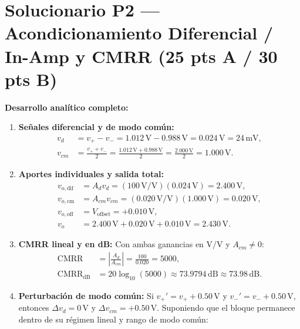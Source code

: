\documentclass[10pt, a4paper]{article}
\begin{document}
\section*{Solucionario P2 --- Acondicionamiento Diferencial / In-Amp y CMRR (25 pts A / 30 pts B)}

\textbf{Desarrollo analítico completo:}
\begin{enumerate}
    \renewcommand{\labelenumi}{(\alph{enumi})}
    \setlength{\itemsep}{3pt}
    \item \textbf{Señales diferencial y de modo común:}
    \begin{align}
        v_d &= v_+ - v_- = 1.012\,\mathrm{V} - 0.988\,\mathrm{V} = 0.024\,\mathrm{V} = 24\,\mathrm{mV}, \\
        v_{cm} &= \frac{v_+ + v_-}{2} = \frac{1.012\,\mathrm{V} + 0.988\,\mathrm{V}}{2} = \frac{2.000\,\mathrm{V}}{2} = 1.000\,\mathrm{V}.
    \end{align}
    \item \textbf{Aportes individuales y salida total:}
    \begin{align}
        v_{o,\mathrm{dif}} &= A_d v_d = (100\,\mathrm{V/V})(0.024\,\mathrm{V}) = 2.400\,\mathrm{V}, \\
        v_{o,\mathrm{cm}} &= A_{cm} v_{cm} = (0.020\,\mathrm{V/V})(1.000\,\mathrm{V}) = 0.020\,\mathrm{V}, \\
        v_{o,\mathrm{off}} &= V_{\mathrm{offset}} = +0.010\,\mathrm{V}, \\
        v_o &= 2.400\,\mathrm{V} + 0.020\,\mathrm{V} + 0.010\,\mathrm{V} = 2.430\,\mathrm{V}.
    \end{align}
    \item \textbf{CMRR lineal y en dB:} Con ambas ganancias en $\mathrm{V/V}$ y $A_{cm} \neq 0$:
    \begin{align}
        \mathrm{CMRR} &= \left|\frac{A_d}{A_{cm}}\right| = \frac{100}{0.020} = 5000, \\
        \mathrm{CMRR}_{\mathrm{dB}} &= 20\log_{10}(5000) \approx 73.9794\,\mathrm{dB} \approx 73.98\,\mathrm{dB}.
    \end{align}
    \item \textbf{Perturbación de modo común:} Si $v_+' = v_+ + 0.50\,\mathrm{V}$ y $v_-' = v_- + 0.50\,\mathrm{V}$, entonces $\Delta v_d = 0\,\mathrm{V}$ y $\Delta v_{cm} = +0.50\,\mathrm{V}$. Suponiendo que el bloque permanece dentro de su régimen lineal y rango de modo común:

\end{enumerate}
\end{document}
